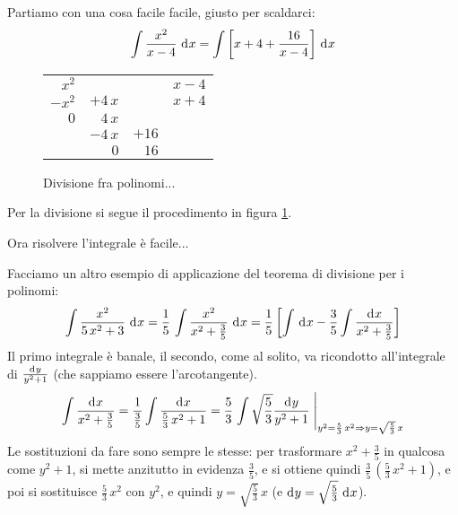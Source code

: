 \begin{exmp}
Partiamo con una cosa facile facile, giusto per scaldarci:
\[
\int \frac{x^2}{x - 4} \dx =
\int \left[ x + 4 + \frac{16}{x-4} \right] \dx 
\]
\begin{figure}[h]
\centering
\begin{tabular}{rrr|r}
$x^2$ & & & $x - 4$ \\ \cline{4-4}
$-x^2$ & $+4 \, x$ & & $x + 4$ \\ \cline{1-2}
$0$ & $4 \, x$ & & \\
& $- 4 \, x$ & $+ 16$ & \\ \cline{2-3}
& $0$ & $16$ & 
\end{tabular}
\caption{\label{fig:divisione}Divisione fra polinomi...}
\end{figure}
Per la divisione si segue il procedimento in figura \ref{fig:divisione}.

Ora risolvere l'integrale \`e facile...
\end{exmp}

\begin{exmp}
Facciamo un altro esempio di applicazione del teorema di divisione per i polinomi:
\[
\int \frac{x^2}{5 \, x^2 + 3} \dx = 
\frac{1}{5} \, \int \frac{x^2}{x^2 + \frac{3}{5}} \dx = 
\frac{1}{5} \left[ \int \dx - \frac{3}{5} \int \frac{\diff x}{x^2 + \frac{3}{5}} \right] 
\]
Il primo integrale \`e banale, il secondo, come al solito, va ricondotto all'integrale di $\frac{\diff y}{y^2 + 1}$ (che sappiamo essere l'arcotangente).
\[
\int \frac{\diff x}{x^2 + \frac{3}{5}} =
\frac{1}{\frac{3}{5}} \int \frac{\diff x}{\frac{5}{3} \, x^2 + 1} =
\frac{5}{3} \substitute{\int \sqrt{\frac{5}{3}} \frac{\diff y}{y^2 + 1} }{y^2 = \frac{5}{3} \, x^2 \implies y = \sqrt{\frac{5}{3}} \, x}
\]
Le sostituzioni da fare sono sempre le stesse: per trasformare $x^2 + \frac{3}{5}$ in qualcosa come $y^2 + 1$, si mette anzitutto in evidenza $\frac{3}{5}$, e si ottiene quindi $\frac{3}{5} \, (\frac{5}{3} \, x^2 + 1)$, e poi si sostituisce $\frac{5}{3} \, x^2$ con $y^2$, e quindi $y = \sqrt{\frac{5}{3}} \, x$ (e $\diff y = \sqrt{\frac{5}{3}} \dx$).
\end{exmp}

